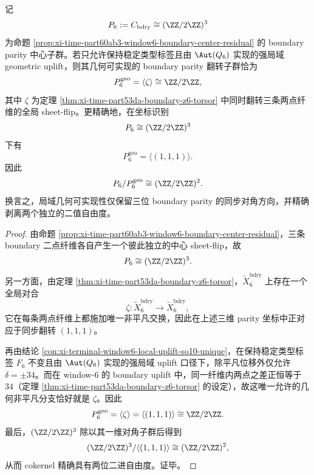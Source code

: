 \begin{theorem}\label{thm:xi-time-part65e-window6-geometric-diagonal-z2-parity}
记
\[
P_6:=C_{\mathrm{bdry}}\cong (\ZZ/2\ZZ)^3
\]
为命题 \ref{prop:xi-time-part60ab3-window6-boundary-center-residual} 的 boundary parity 中心子群。若只允许保持稳定类型标签且由 \(\Aut(Q_6)\) 实现的强局域 geometric uplift，则其几何可实现的 boundary parity 翻转子群恰为
\[
P_6^{\mathrm{geo}}=\langle\zeta\rangle\cong \ZZ/2\ZZ,
\]
其中 \(\zeta\) 为定理 \ref{thm:xi-time-part53da-boundary-z6-torsor} 中同时翻转三条两点纤维的全局 sheet-flip。更精确地，在坐标识别
\[
P_6\cong (\ZZ/2\ZZ)^3
\]
下有
\[
P_6^{\mathrm{geo}}=\langle(1,1,1)\rangle.
\]
因此
\[
P_6/P_6^{\mathrm{geo}}\cong (\ZZ/2\ZZ)^2.
\]
换言之，局域几何可实现性仅保留三位 boundary parity 的同步对角方向，并精确剥离两个独立的二值自由度。
\end{theorem}
\begin{proof}
由命题 \ref{prop:xi-time-part60ab3-window6-boundary-center-residual}，三条 boundary 二点纤维各自产生一个彼此独立的中心 sheet-flip，故
\[
P_6\cong (\ZZ/2\ZZ)^3.
\]
另一方面，由定理 \ref{thm:xi-time-part53da-boundary-z6-torsor}，\(\widetilde X_6^{\mathrm{bdry}}\) 上存在一个全局对合
\[
\zeta:\widetilde X_6^{\mathrm{bdry}}\to \widetilde X_6^{\mathrm{bdry}},
\]
它在每条两点纤维上都施加唯一非平凡交换，因此在上述三维 parity 坐标中正对应于同步翻转 \((1,1,1)\)。

再由结论 \ref{con:xi-terminal-window6-local-uplift-so10-unique}，在保持稳定类型标签 \(F_6\) 不变且由 \(\Aut(Q_6)\) 实现的强局域 uplift 口径下，除平凡位移外仅允许 \(\delta=\pm 34\)。而在 window-\(6\) 的 boundary uplift 中，同一纤维内两点之差正恒等于 \(34\)（定理 \ref{thm:xi-time-part53da-boundary-z6-torsor} 的设定），故这唯一允许的几何非平凡分支恰好就是 \(\zeta\)。因此
\[
P_6^{\mathrm{geo}}=\langle \zeta\rangle=\langle(1,1,1)\rangle\cong \ZZ/2\ZZ.
\]
最后，\((\ZZ/2\ZZ)^3\) 除以其一维对角子群后得到
\[
(\ZZ/2\ZZ)^3/\langle(1,1,1)\rangle\cong (\ZZ/2\ZZ)^2,
\]
从而 cokernel 精确具有两位二进自由度。证毕。
\end{proof}

